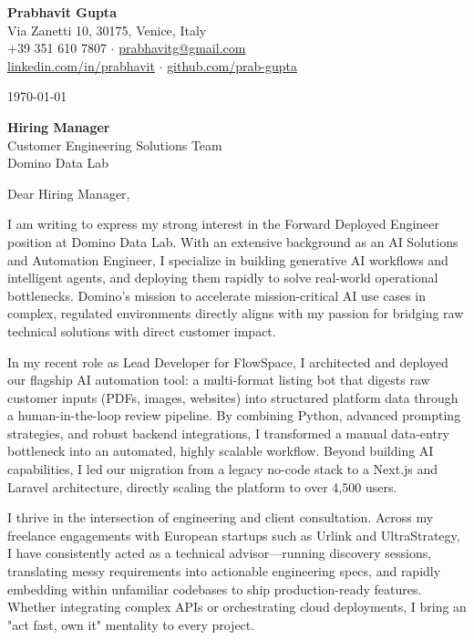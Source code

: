 \documentclass[11pt,a4paper]{article}
\begin{document}
\begin{center}
    {\LARGE \textbf{Prabhavit Gupta}} \\
    \vspace{0.5em}
    Via Zanetti 10, 30175, Venice, Italy \\
    +39 351 610 7807 $\cdot$ \href{mailto:prabhavitg@gmail.com}{prabhavitg@gmail.com} \\
    \href{https://www.linkedin.com/in/prabhavit/}{linkedin.com/in/prabhavit} $\cdot$ \href{https://github.com/prab-gupta}{github.com/prab-gupta}
\end{center}

\vspace{2em}
\noindent\today

\vspace{1em}
\noindent \textbf{Hiring Manager} \\
Customer Engineering Solutions Team \\
Domino Data Lab

\vspace{1em}
\noindent Dear Hiring Manager,

\vspace{1em}
I am writing to express my strong interest in the Forward Deployed Engineer position at Domino Data Lab. With an extensive background as an AI Solutions and Automation Engineer, I specialize in building generative AI workflows and intelligent agents, and deploying them rapidly to solve real-world operational bottlenecks. Domino's mission to accelerate mission-critical AI use cases in complex, regulated environments directly aligns with my passion for bridging raw technical solutions with direct customer impact.

In my recent role as Lead Developer for FlowSpace, I architected and deployed our flagship AI automation tool: a multi-format listing bot that digests raw customer inputs (PDFs, images, websites) into structured platform data through a human-in-the-loop review pipeline. By combining Python, advanced prompting strategies, and robust backend integrations, I transformed a manual data-entry bottleneck into an automated, highly scalable workflow. Beyond building AI capabilities, I led our migration from a legacy no-code stack to a Next.js and Laravel architecture, directly scaling the platform to over 4,500 users.

I thrive in the intersection of engineering and client consultation. Across my freelance engagements with European startups such as Urlink and UltraStrategy, I have consistently acted as a technical advisor—running discovery sessions, translating messy requirements into actionable engineering specs, and rapidly embedding within unfamiliar codebases to ship production-ready features. Whether integrating complex APIs or orchestrating cloud deployments, I bring an "act fast, own it" mentality to every project.
\end{document}
